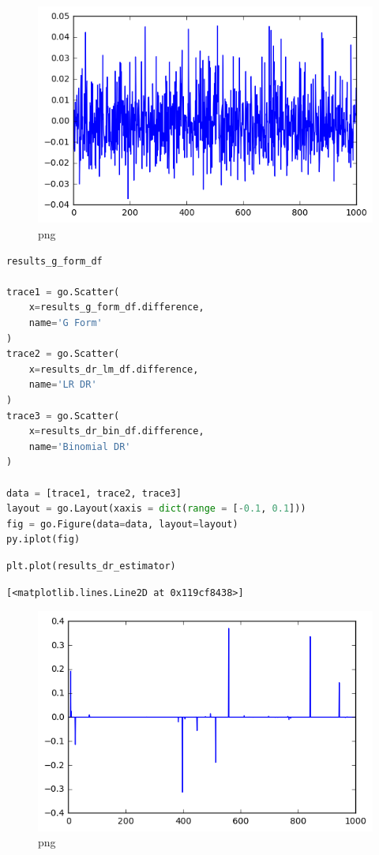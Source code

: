 \begin{figure}
\centering
\includegraphics{Final_Iteration_files/Final_Iteration_30_1.png}
\caption{png}
\end{figure}

\begin{lstlisting}[language=Python]
results_g_form_df

trace1 = go.Scatter(
    x=results_g_form_df.difference,
    name='G Form'
)
trace2 = go.Scatter(
    x=results_dr_lm_df.difference,
    name='LR DR'
)
trace3 = go.Scatter(
    x=results_dr_bin_df.difference,
    name='Binomial DR'
)

data = [trace1, trace2, trace3]
layout = go.Layout(xaxis = dict(range = [-0.1, 0.1]))
fig = go.Figure(data=data, layout=layout)
py.iplot(fig)
\end{lstlisting}

\begin{lstlisting}[language=Python]
plt.plot(results_dr_estimator)
\end{lstlisting}

\begin{lstlisting}
[<matplotlib.lines.Line2D at 0x119cf8438>]
\end{lstlisting}

\begin{figure}
\centering
\includegraphics{Final_Iteration_files/Final_Iteration_32_1.png}
\caption{png}
\end{figure}

\begin{lstlisting}[language=Python]
\end{lstlisting}

\begin{lstlisting}[language=Python]
\end{lstlisting}
